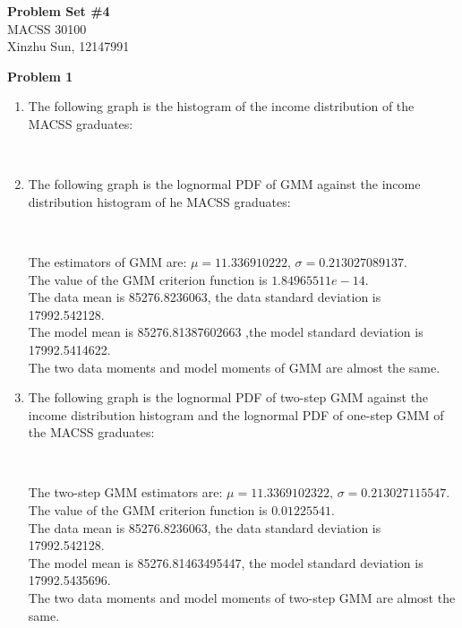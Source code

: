 \documentclass[letterpaper,12pt]{article}
\theoremstyle{definition}
\numberwithin{equation}{section}
\begin{document}
\begin{flushleft}
   \textbf{\Large{Problem Set \#4}} \\
   MACSS 30100 \\
   Xinzhu Sun, 12147991\\
\end{flushleft}

\noindent \textbf{\large Problem 1}\par

\begin{enumerate} [\bfseries (a)]
\item The following graph is the histogram of the income distribution of the MACSS graduates:\\
\begin{figure}[H]
\centering
{}\
\end{figure}\par

\item The following graph is the lognormal PDF of GMM against the income distribution histogram of he MACSS graduates:
\begin{figure}[H]
\centering
{}\
\end{figure}\par
The estimators of GMM are: \(\mu = 11.336910222, \, \sigma = 0.213027089137\). \\
The value of the GMM criterion function is \(1.84965511e-14\).\\
The data mean is 85276.8236063, the data standard deviation is  17992.542128.\\
The model mean is 85276.81387602663 ,the model standard deviation is 17992.5414622.\\
The two data moments and model moments of GMM are almost the same.\par	

\item The following graph is the lognormal PDF of two-step GMM against the income distribution histogram and the lognormal PDF of one-step GMM of the MACSS graduates:
\begin{figure}[H]
\centering
{}\
\end{figure}\par
The two-step GMM estimators are: \(\mu = 11.3369102322, \, \sigma = 0.213027115547\). \\
The value of the GMM criterion function is \(0.01225541\).\\
The data mean is 85276.8236063, the data standard deviation is 17992.542128.\\
The model mean is  85276.81463495447, the model standard deviation is 17992.5435696.\\
The two data moments and model moments of two-step GMM are almost the same.\par	


\end{enumerate}
\end{document}
